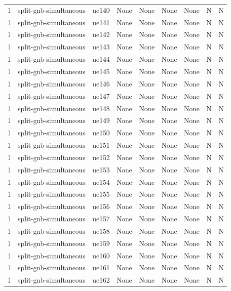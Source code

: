 \begin{table}[ht]
\begin{tabular}{|c|c|c|c|c|c|c|c|c|}
1 & split-gnb-simultaneous & ue140 & None & None & None & None & N & N \\
1 & split-gnb-simultaneous & ue141 & None & None & None & None & N & N \\
1 & split-gnb-simultaneous & ue142 & None & None & None & None & N & N \\
1 & split-gnb-simultaneous & ue143 & None & None & None & None & N & N \\
1 & split-gnb-simultaneous & ue144 & None & None & None & None & N & N \\
1 & split-gnb-simultaneous & ue145 & None & None & None & None & N & N \\
1 & split-gnb-simultaneous & ue146 & None & None & None & None & N & N \\
1 & split-gnb-simultaneous & ue147 & None & None & None & None & N & N \\
1 & split-gnb-simultaneous & ue148 & None & None & None & None & N & N \\
1 & split-gnb-simultaneous & ue149 & None & None & None & None & N & N \\
1 & split-gnb-simultaneous & ue150 & None & None & None & None & N & N \\
1 & split-gnb-simultaneous & ue151 & None & None & None & None & N & N \\
1 & split-gnb-simultaneous & ue152 & None & None & None & None & N & N \\
1 & split-gnb-simultaneous & ue153 & None & None & None & None & N & N \\
1 & split-gnb-simultaneous & ue154 & None & None & None & None & N & N \\
1 & split-gnb-simultaneous & ue155 & None & None & None & None & N & N \\
1 & split-gnb-simultaneous & ue156 & None & None & None & None & N & N \\
1 & split-gnb-simultaneous & ue157 & None & None & None & None & N & N \\
1 & split-gnb-simultaneous & ue158 & None & None & None & None & N & N \\
1 & split-gnb-simultaneous & ue159 & None & None & None & None & N & N \\
1 & split-gnb-simultaneous & ue160 & None & None & None & None & N & N \\
1 & split-gnb-simultaneous & ue161 & None & None & None & None & N & N \\
1 & split-gnb-simultaneous & ue162 & None & None & None & None & N & N \\

\end{tabular}
\end{table}
